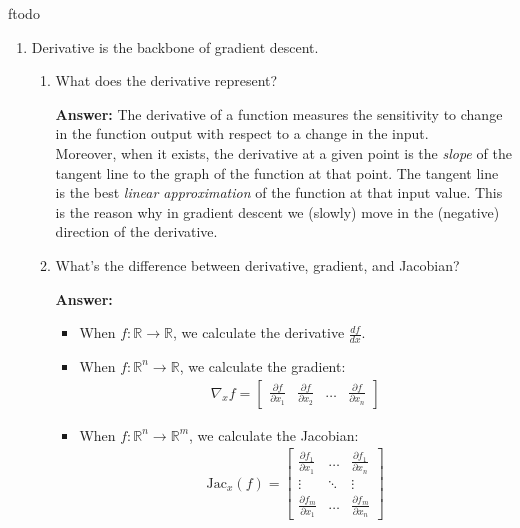 ƒtodo\documentclass{article}
\newenvironment{QandA}{\begin{enumerate}[label=\arabic*.]}{\end{enumerate}}
\newenvironment{InnerQandA}{\begin{enumerate}[label=\roman*.]}{\end{enumerate}}
\newenvironment{answer}{\par\normalfont \textbf{Answer:}}{}
\newcommand{\R}{\mathbb{R}}
\newcommand{\Jac}{\text{Jac}}
\begin{document}
\begin{QandA}
    \item Derivative is the backbone of gradient descent.
    \begin{InnerQandA}
        \item What does the derivative represent?
        \begin{answer}
            The derivative of a function measures the sensitivity to change in the function output with respect to a change in the input. \\
            Moreover, when it exists, the derivative at a given point is the \textit{slope} of the tangent line to the graph of the function at that point. The tangent line is the best \textit{linear approximation} of the function at that input value. This is the reason why in gradient descent we (slowly) move in the (negative) direction of the derivative. 
        \end{answer}
        \item What’s the difference between derivative, gradient, and Jacobian?
        \begin{answer}
            \begin{itemize}
                \item When $f: \R \rightarrow \R$, we calculate the derivative $\frac{df}{dx}$.
                \item When $f: \R^n \rightarrow \R$, we calculate the gradient:
                \begin{align*}
                    \nabla_x f = 
                    \begin{bmatrix}
                     \frac{\partial f}{ \partial x_1} & \frac{\partial f}{ \partial x_2} & \ldots  & \frac{\partial f}{ \partial x_n}
                    \end{bmatrix}
                \end{align*}
                \item When $f: \R^n \rightarrow \R^m$, we calculate the Jacobian:
                \begin{align*}
                    \Jac_x(f) = 
                    \begin{bmatrix}
                     \frac{\partial f_1}{ \partial x_1} & \ldots & \frac{\partial f_1}{ \partial x_n} \\
                     \vdots & \ddots & \vdots \\
                     \frac{\partial f_m}{ \partial x_1} & \ldots & \frac{\partial f_m}{ \partial x_n}
                    \end{bmatrix}
                \end{align*}
            \end{itemize}
        \end{answer}
    \end{InnerQandA}
    

\end{QandA}
\end{document}
